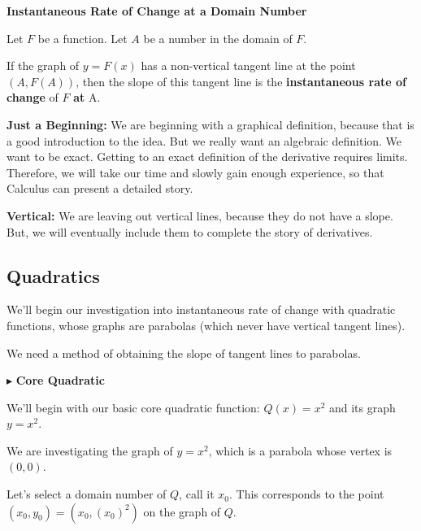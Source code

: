 \documentclass{ximera}
\begin{document}
\begin{definition} \textbf{\textcolor{green!50!black}{Instantaneous Rate of Change at a Domain Number}}  


Let $F$ be a function. Let $A$ be a number in the domain of $F$.

If the graph of $y = F(x)$ has a non-vertical tangent line at the point $(A, F(A))$, then the slope of this tangent line is the \textbf{instantaneous rate of change} of $F$ \textbf{at} A.




\end{definition}



\textbf{Just a Beginning:} We are beginning with a graphical definition, because that is a good introduction to the idea.  But we really want an algebraic definition.  We want to be exact.  Getting to an exact definition of the derivative requires limits.  Therefore, we will take our time and slowly gain enough experience, so that Calculus can present a detailed story.

\textbf{Vertical:} We are leaving out vertical lines, because they do not have a slope.  But, we will eventually include them to complete the story of derivatives.








\subsection*{Quadratics}

We'll begin our investigation into instantaneous rate of change with quadratic functions, whose graphs are parabolas (which never have vertical tangent lines). 


We need a method of obtaining the slope of tangent lines to parabolas.







$\blacktriangleright$ \textbf{Core Quadratic}


We'll begin with our basic core quadratic function: \textbf{\textcolor{purple!85!blue}{$Q(x) = x^2$}} and its graph \textbf{\textcolor{purple!85!blue}{$y = x^2$}}. 


We are investigating the graph of $y = x^2$, which is a parabola whose vertex is $(0, 0)$. 

Let's select a domain number of $Q$, call it $x_0$.   This corresponds to the point $(x_0, y_0) = (x_0, (x_0)^2)$ on the graph of $Q$.
\end{document}
